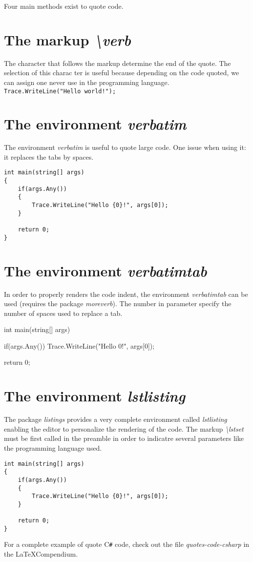 \documentclass{article}
\begin{document}
Four main methods exist to quote code.

\section*{The markup \emph{\textbackslash verb}}

The character that follows the markup determine the end of the quote. The selection of this charac ter is useful because depending on the code quoted, we can assign one never use in the programming language. \\

\verb|Trace.WriteLine("Hello world!");|


\section*{The environment \emph{verbatim}}

The environment \emph{verbatim} is useful to quote large code. One issue when using it: it replaces the tabs by spaces.

\begin{verbatim}
int main(string[] args)
{
	if(args.Any())
	{
		Trace.WriteLine("Hello {0}!", args[0]);
	}
	
	return 0;
}
\end{verbatim}


\section*{The environment \emph{verbatimtab}}

In order to properly renders the code indent, the environment \emph{verbatimtab} can be used (requires the package \emph{moreverb}). The number in parameter specify the number of spaces used to replace a tab.

\begin{verbatimtab}[5]
int main(string[] args)
{
	if(args.Any())
	{
		Trace.WriteLine("Hello {0}!", args[0]);
	}
	
	return 0;
}
\end{verbatimtab}


\section*{The environment \emph{lstlisting}}

The package \emph{listings} provides a very complete environment called \emph{lstlisting} enabling the editor to personalize the rendering of the code. The markup \emph{\textbackslash lstset} must be first called in the preamble in order to indicatre several parameters like the programming language used.

\begin{lstlisting}
int main(string[] args)
{
	if(args.Any())
	{
		Trace.WriteLine("Hello {0}!", args[0]);
	}
	
	return 0;
}
\end{lstlisting}

For a complete example of quote C\texttt{\#} code, check out the file \emph{quotes-code-csharp} in the \LaTeX Compendium.
	
\end{document}
